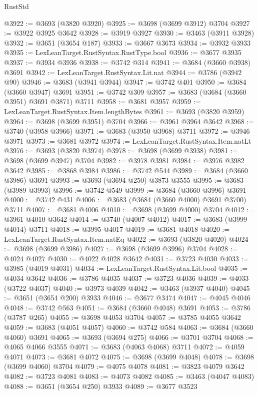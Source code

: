 \begin{lexlean}{RustStd}
\begin{coremodule}
@3922 := @3693 (@3820 @3920)
@3925 := @3698 (@3699 @3912) @3704
@3927 := @3922 @3925 @3642
@3928 := @3919 @3927
@3930 := @3463 (@3911 @3928)
@3932 := @3651 (@3654 @187)
@3933 := @3667 @3673
@3934 := @3932 @3933
@3935 := LexLeanTarget.RustSyntax.RustType.bool
@3936 := @3677 @3935
@3937 := @3934 @3936
@3938 := @3742 @314
@3941 := @3684 (@3660 @3938) @3691
@3942 := LexLeanTarget.RustSyntax.Lit.nat
@3944 := @3786 (@3942 @90)
@3946 := @3683 (@3941 @3944)
@3947 := @3742 @401
@3950 := @3684 (@3660 @3947) @3691
@3951 := @3742 @309
@3957 := @3683 (@3684 (@3660 @3951) @3691 @3871) @3711
@3958 := @3681 @3957
@3959 := LexLeanTarget.RustSyntax.Item.lengthBytes
@3961 := @3693 (@3820 @3959)
@3964 := @3698 (@3699 @3951) @3704
@3966 := @3961 @3964 @3642
@3968 := @3740 (@3958 @3966)
@3971 := @3683 (@3950 @3968) @3711
@3972 := @3946 @3971
@3973 := @3681 @3972
@3974 := LexLeanTarget.RustSyntax.Item.natLt
@3976 := @3693 (@3820 @3974)
@3978 := @3698 (@3699 @3938)
@3981 := @3698 (@3699 @3947) @3704
@3982 := @3978 @3981
@3984 := @3976 @3982 @3642
@3985 := @3868 @3984
@3986 := @3742 @544
@3989 := @3684 (@3660 @3986) @3691
@3993 := @3693 (@3694 @250) @3873 @3555
@3995 := @3683 (@3989 @3993)
@3996 := @3742 @549
@3999 := @3684 (@3660 @3996) @3691
@4000 := @3742 @431
@4006 := @3683 (@3684 (@3660 @4000) @3691 @3700) @3711
@4007 := @3681 @4006
@4010 := @3698 (@3699 @4000) @3704
@4012 := @3961 @4010 @3642
@4014 := @3740 (@4007 @4012)
@4017 := @3683 (@3999 @4014) @3711
@4018 := @3995 @4017
@4019 := @3681 @4018
@4020 := LexLeanTarget.RustSyntax.Item.natEq
@4022 := @3693 (@3820 @4020)
@4024 := @3698 (@3699 @3986)
@4027 := @3698 (@3699 @3996) @3704
@4028 := @4024 @4027
@4030 := @4022 @4028 @3642
@4031 := @3723 @4030
@4033 := @3985 (@4019 @4031)
@4034 := LexLeanTarget.RustSyntax.Lit.bool
@4035 := @4034 @3642
@4036 := @3786 @4035
@4037 := @3723 @4036
@4039 := @4033 (@3722 @4037)
@4040 := @3973 @4039
@4042 := @3463 (@3937 @4040)
@4045 := @3651 (@3654 @200) @3933
@4046 := @3677 @3474
@4047 := @4045 @4046
@4048 := @3742 @563
@4051 := @3684 (@3660 @4048) @3691
@4053 := @3786 (@3787 @265)
@4055 := @3698 @4053 @3704
@4057 := @3785 @4055 @3642
@4059 := @3683 (@4051 @4057)
@4060 := @3742 @584
@4063 := @3684 (@3660 @4060) @3691
@4065 := @3693 (@3694 @275)
@4066 := @3701 @3704
@4068 := @4065 @4066 @3555
@4071 := @3683 (@4063 @4068) @3711
@4072 := @4059 @4071
@4073 := @3681 @4072
@4075 := @3698 (@3699 @4048)
@4078 := @3698 (@3699 @4060) @3704
@4079 := @4075 @4078
@4081 := @3823 @4079 @3642
@4082 := @3723 @4081
@4083 := @4073 @4082
@4085 := @3463 (@4047 @4083)
@4088 := @3651 (@3654 @250) @3933
@4089 := @3677 @3523

\end{coremodule}
\end{lexlean}
